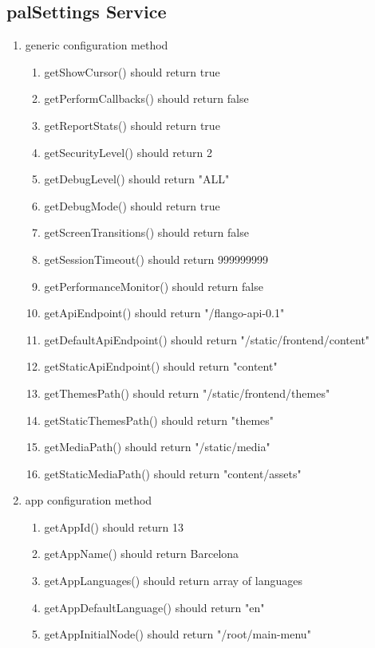 \begin{singlespace}
\section{palSettings Service}
\begin{enumerate}
\item     generic configuration method
\begin{enumerate}
\item         getShowCursor() should return true
\item         getPerformCallbacks() should return false
\item         getReportStats() should return true
\item         getSecurityLevel() should return 2
\item         getDebugLevel() should return "ALL"
\item         getDebugMode() should return true
\item         getScreenTransitions() should return false
\item         getSessionTimeout() should return 999999999
\item         getPerformanceMonitor() should return false
\item         getApiEndpoint() should return "/flango-api-0.1"
\item         getDefaultApiEndpoint() should return "/static/frontend/content"
\item         getStaticApiEndpoint() should return "content"
\item         getThemesPath() should return "/static/frontend/themes"
\item         getStaticThemesPath() should return "themes"
\item         getMediaPath() should return "/static/media"
\item         getStaticMediaPath() should return "content/assets"
\end{enumerate}
\item     app configuration method
\begin{enumerate}
\item         getAppId() should return 13
\item         getAppName() should return Barcelona
\item         getAppLanguages() should return array of languages
\item         getAppDefaultLanguage() should return "en"
\item         getAppInitialNode() should return "/root/main-menu"

\end{enumerate}
\end{enumerate}
\end{singlespace}
